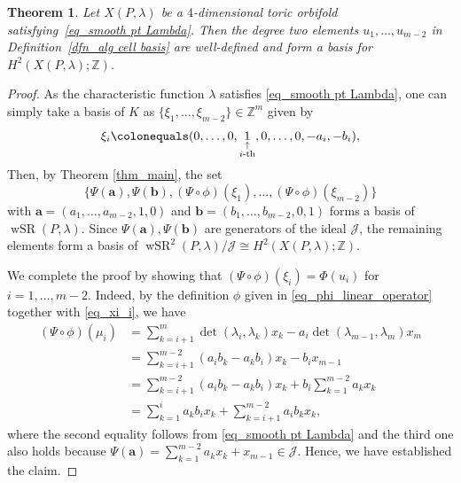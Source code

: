 \documentclass[10pt]{amsart}
\theoremstyle{plain}
\newtheorem{theorem}{Theorem}[section]
\theoremstyle{definition}
\numberwithin{equation}{section}
\newcommand{\ZZ}{\mathbb{Z}}
\DeclareMathOperator{\wSR}{wSR}
\begin{document}
\begin{theorem}\label{thm_alg cellular basis}
Let $X(P,\lambda)$ be a $4$-dimensional toric orbifold satisfying~\eqref{eq_smooth pt Lambda}.
Then the degree two elements $u_1,\ldots,u_{m-2}$ in Definition~\ref{dfn_alg cell basis} are well-defined and form a basis for $H^2(X(P,\lambda);\ZZ)$.
\end{theorem}

\begin{proof}
As the characteristic function $\lambda$ satisfies \eqref{eq_smooth pt Lambda}, one can simply take a basis of $K$ as $\{\xi_1, \dots, \xi_{m-2}\}\in \ZZ^m$ given by  
\begin{equation}\label{eq_xi_i}
\xi_i\colonequals (0,\dots, 0, \underset{\substack{\uparrow \\ i\text{-th}}}{1}, 0, \dots, 0, -a_i, -b_i),
\end{equation}
Then, by Theorem \ref{thm_main}, the set 
\[
\{\Psi(\mathbf{a}), \Psi(\mathbf{b}), (\Psi\circ\phi)(\xi_1), \dots, (\Psi\circ \phi)(\xi_{m-2})\}
\]
with $\mathbf{a}=(a_1, \dots, a_{m-2}, 1,0)$ and $\mathbf{b}=(b_1, \dots, b_{m-2}, 0,1)$ forms a basis of $\wSR(P, \lambda)$. Since $\Psi(\mathbf{a}), \Psi(\mathbf{b})$ are generators of the ideal $\mathcal{J}$, the remaining elements form a basis of $\wSR^2(P, \lambda)/\mathcal{J}\cong H^2(X(P, \lambda);\ZZ)$. 

We complete the proof by showing that $(\Psi\circ\phi)(\xi_i)=\Phi(u_i)$ for $i=1, \dots, m-2$. Indeed, by the definition $\phi$ given in \eqref{eq_phi_linear_operator} together with \eqref{eq_xi_i}, we have 
\begin{align*}
(\Psi\circ\phi)(\mu_i) &=  \sum_{k={i+1}}^{m} \det(\lambda_i, \lambda_k)x_k -a_i \det(\lambda_{m-1}, \lambda_m)x_m\\
&= \sum_{k={i+1}}^{m-2} (a_ib_k-a_kb_i)x_k - b_ix_{m-1} \\
&= \sum_{k={i+1}}^{m-2} (a_ib_k-a_kb_i)x_k + b_i\sum_{k=1}^{m-2}a_kx_k\\
&=\sum_{k=1}^ia_kb_ix_k + \sum_{k=i+1}^{m-2}a_ib_k x_k,
\end{align*}
where the second equality follows from \eqref{eq_smooth pt Lambda} and the third one also holds because $\Psi(\mathbf{a})=\sum_{k=1}^{m-2}a_kx_k+x_{m-1}\in \mathcal{J}$. Hence, we have established the claim. 
\end{proof}
\end{document}
